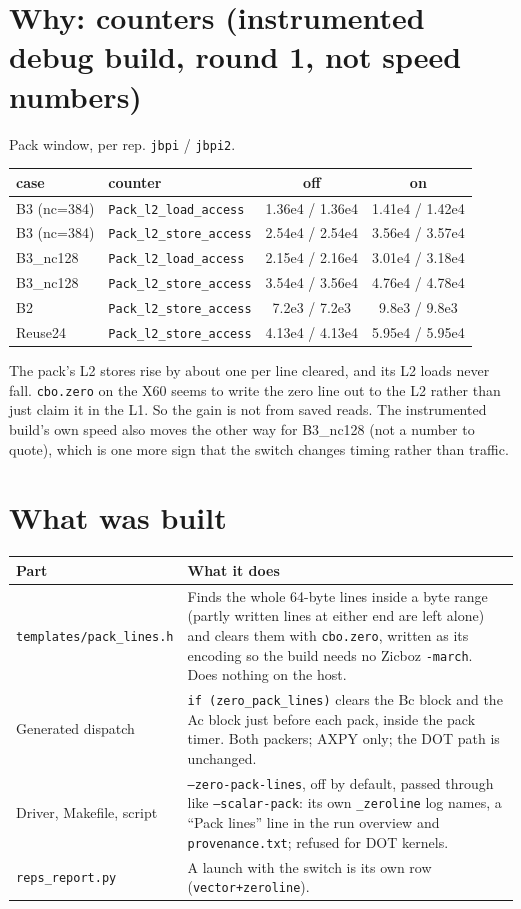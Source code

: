 \documentclass[10pt,a4paper]{article}
\newcommand{\up}[1]{\textcolor{red!70!black}{#1}}
\begin{document}
\section{Why: counters (instrumented debug build, round 1, not speed numbers)}
Pack window, per rep. \texttt{jbpi} / \texttt{jbpi2}.
\begin{center}\footnotesize
\begin{tabular}{@{}llcc@{}}
\toprule
case & counter & off & on \\
\midrule
B3 (nc=384) & \texttt{Pack\_l2\_load\_access} & 1.36e4 / 1.36e4 & 1.41e4 / 1.42e4 \\
B3 (nc=384) & \texttt{Pack\_l2\_store\_access} & 2.54e4 / 2.54e4 & \up{3.56e4 / 3.57e4} \\
B3\_nc128 & \texttt{Pack\_l2\_load\_access} & 2.15e4 / 2.16e4 & \up{3.01e4 / 3.18e4} \\
B3\_nc128 & \texttt{Pack\_l2\_store\_access} & 3.54e4 / 3.56e4 & \up{4.76e4 / 4.78e4} \\
B2 & \texttt{Pack\_l2\_store\_access} & 7.2e3 / 7.2e3 & \up{9.8e3 / 9.8e3} \\
Reuse24 & \texttt{Pack\_l2\_store\_access} & 4.13e4 / 4.13e4 & \up{5.95e4 / 5.95e4} \\
\bottomrule
\end{tabular}
\end{center}
The pack's L2 stores rise by about one per line cleared, and its L2 loads never fall. \texttt{cbo.zero} on the X60
seems to write the zero line out to the L2 rather than just claim it in the L1. So the gain is not from saved reads.
The instrumented build's own speed also moves the other way for B3\_nc128 (not a number to quote), which is one more
sign that the switch changes timing rather than traffic.

\section{What was built}
\begin{tabularx}{\linewidth}{@{}>{\raggedright\arraybackslash}p{4.1cm}X@{}}
\toprule
Part & What it does \\
\midrule
\texttt{templates/pack\_lines.h} & Finds the whole 64-byte lines inside a byte range (partly written lines at either
end are left alone) and clears them with \texttt{cbo.zero}, written as its encoding so the build needs no Zicboz
\texttt{-march}. Does nothing on the host. \\
Generated dispatch & \texttt{if (zero\_pack\_lines)} clears the Bc block and the Ac block just before each pack,
inside the pack timer. Both packers; AXPY only; the DOT path is unchanged. \\
Driver, Makefile, script & \texttt{--zero-pack-lines}, off by default, passed through like \texttt{--scalar-pack}:
its own \texttt{\_zeroline} log names, a ``Pack lines'' line in the run overview and \texttt{provenance.txt};
refused for DOT kernels. \\
\texttt{reps\_report.py} & A launch with the switch is its own row (\texttt{vector+zeroline}). \\
\bottomrule
\end{tabularx}
\end{document}
